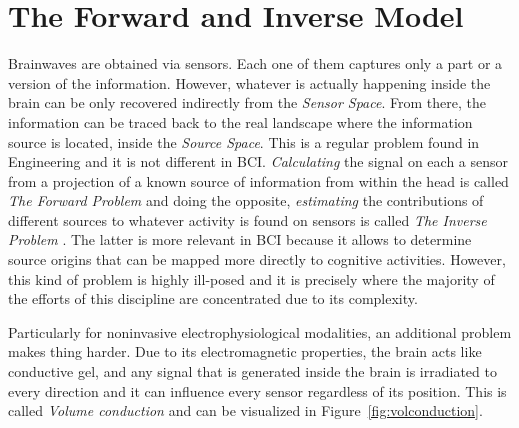%

\section{The Forward and Inverse Model}

Brainwaves are obtained via sensors. Each one of them captures only a part or a version of the information.  However, whatever is actually happening inside the brain can be only recovered indirectly from the \textit{Sensor Space}. From there, the information can be traced back to the real landscape where the information source is located, inside the \textit{Source Space}.  This is a regular problem found in Engineering and it is not different in BCI.  \textit{Calculating} the signal on each a sensor from a projection of a known source of information from within the head is called \textit{The Forward Problem}\cite{Parra2008,WolpawJonathanR2012}  and doing the opposite, \textit{estimating} the contributions of different sources to whatever activity is found on sensors is called  \textit{The Inverse Problem} .  The latter is more relevant in BCI because it allows to determine source origins that can be mapped more directly to cognitive activities.  However, this kind of problem is highly ill-posed and it is precisely where the majority of the efforts of this discipline are concentrated due to its complexity.

Particularly for noninvasive electrophysiological modalities, an additional problem makes thing harder.  Due to its electromagnetic properties, the brain acts like conductive gel, and any signal that is generated inside the brain is irradiated to every direction and it can influence every sensor regardless of its position.  This is called \textit{Volume conduction} \cite{Nam2018,Buzsaki2012} and can be visualized in Figure~\ref{fig:volconduction}.

